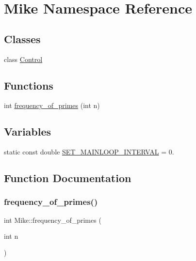 \hypertarget{namespace_mike}{}\section{Mike Namespace Reference}
\label{namespace_mike}
\subsection*{Classes}
\begin{DoxyCompactItemize}
\item 
class \hyperlink{class_mike_1_1_control}{Control}
\end{DoxyCompactItemize}
\subsection*{Functions}
\begin{DoxyCompactItemize}
\item 
int \hyperlink{namespace_mike_ada7afe897748f668730c74456952e356}{frequency\+\_\+of\+\_\+primes} (int n)
\end{DoxyCompactItemize}
\subsection*{Variables}
\begin{DoxyCompactItemize}
\item 
static const double \hyperlink{namespace_mike_abbeda217f93388b7dd036c32d183f426}{S\+E\+T\+\_\+\+M\+A\+I\+N\+L\+O\+O\+P\+\_\+\+I\+N\+T\+E\+R\+V\+AL} = 0.
\end{DoxyCompactItemize}


\subsection{Function Documentation}
\mbox{\label{namespace_mike_ada7afe897748f668730c74456952e356}} 
\subsubsection{\texorpdfstring{frequency\+\_\+of\+\_\+primes()}{frequency\_of\_primes()}}
{\footnotesize\ttfamily int Mike\+::frequency\+\_\+of\+\_\+primes (\begin{DoxyParamCaption}\item[{int}]{n }\end{DoxyParamCaption})}



